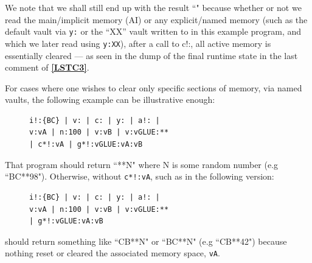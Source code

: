 \documentclass[a4paper, 18pt]{book} %
\begin{document}
We note that we shall still end up with the result ``" because whether or not we read the main/implicit memory (AI) or any explicit/named memory (such as the default vault via \texttt{y:} or the ``XX” vault written to in this example program, and which we later read using \texttt{y:XX}), after a call to c!:, all active memory is essentially cleared --- as seen in the dump of the final runtime state in the last comment of \textbf{\autoref{LSTC3}}.


For cases where one wishes to clear only specific sections of memory, via named vaults, the following example can be illustrative enough:

\begin{figure}[H]
 \Large
  \centering
  \begin{tcolorbox}[teaterminalstyle, title=TEA Program: \texttt{c!:} resets all memory]
  \begin{lstlisting}[language=TEA, caption={TP C4}, label={LSTC4}, ]
i!:{BC} | v: | c: | y: | a!: |
v:vA | n:100 | v:vB | v:vGLUE:** 
| c*!:vA | g*!:vGLUE:vA:vB
   \end{lstlisting}
  \end{tcolorbox}
\end{figure}

That program should return ``**N" where N is some random number (e.g ``BC**98"). Otherwise, without \texttt{c*!:vA}, such as in the following version:

\begin{figure}[H]
 \Large
  \centering
  \begin{tcolorbox}[teaterminalstyle, title=TEA Program: \texttt{c!:} resets all memory]
  \begin{lstlisting}[language=TEA, caption={TP C5}, label={LSTC5}, ]
i!:{BC} | v: | c: | y: | a!: | 
v:vA | n:100 | v:vB | v:vGLUE:** 
| g*!:vGLUE:vA:vB
   \end{lstlisting}
  \end{tcolorbox}
\end{figure}

 
 should return something like ``CB**N" or ``BC**N" (e.g ``CB**42") because nothing reset or cleared the associated memory space, \texttt{vA}. 
 
\end{document}
